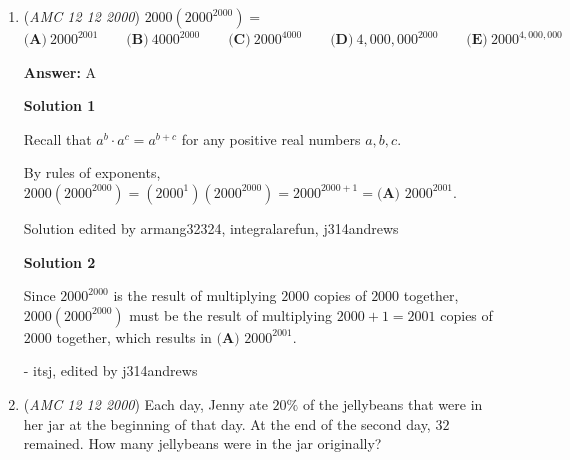\begin{enumerate}
\textbf{Solution 3}

The sum is the highest if two \href{https://artofproblemsolving.com/wiki/index.php?title=Factor}{factors} are the lowest.

 So, $1 \cdot 3 \cdot 667 = 2001$ and $1+3+667=671 \Longrightarrow \boxed{\text{(E) 671}}$.

 



\textbf{Solution 4 (Answer Choices)}

We see since $2 + 0 + 0 + 1$ is divisible by $3$, we can eliminate all of the first $4$ answer choices because they are way too small and get $\boxed{\text{(E) 671}}$ as our final answer.

 


 


	\item (\textit{AMC 12 12 2000}) $2000(2000^{2000}) =$
$\textbf{(A)}\ 2000^{2001} \qquad \textbf{(B)}\ 4000^{2000} \qquad \textbf{(C)}\ 2000^{4000} \qquad \textbf{(D)}\ 4,000,000^{2000} \qquad \textbf{(E)}\ 2000^{4,000,000}$

 \textbf{Answer: }A



\textbf{Solution 1}

Recall that $a^{b}\cdot a^{c} = a^{b+c}$ for any positive real numbers $a, b, c$.

 By rules of exponents, $2000\left(2000^{2000}\right) = \left(2000^{1}\right)\left(2000^{2000}\right) = 2000^{2000+1} = \boxed{\textbf{(A) } 2000^{2001}}$.

 Solution edited by armang32324, integralarefun, j314andrews

 



\textbf{Solution 2}

Since $2000^2000$ is the result of multiplying $2000$ copies of $2000$ together, $2000\left(2000^{2000}\right)$ must be the result of multiplying $2000 + 1 = 2001$ copies of $2000$ together, which results in $\boxed{\textbf{(A) } 2000^{2001}}$.

 - itsj, edited by j314andrews

 


	\item (\textit{AMC 12 12 2000}) Each day, Jenny ate $20\%$ of the jellybeans that were in her jar at the beginning of that day. At the end of the second day, $32$ remained. How many jellybeans were in the jar originally?



\end{enumerate}

